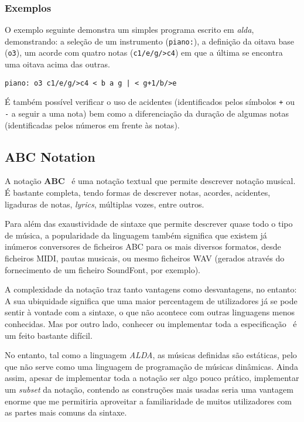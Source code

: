 \subsubsection{Exemplos}
O exemplo seguinte demonstra um simples programa escrito em \textit{alda}, demonstrando: a seleção de um instrumento (\texttt{piano:}), a definição da oitava base (\texttt{o3}), um acorde com quatro notas (\texttt{c1/e/g/>c4}) em que a última se encontra uma oitava acima das outras.
\begin{lstlisting}[caption={Exemplo da linguagem alda}]
piano: o3 c1/e/g/>c4 < b a g | < g+1/b/>e
\end{lstlisting}
 É também possível verificar o uso de acidentes (identificados pelos símbolos \texttt{+} ou \texttt{-} a seguir a uma nota) bem como a diferenciação da duração de algumas notas (identificadas pelos números em frente às notas).
\subsection{ABC Notation}
A notação \textbf{ABC}~\citep{AbcPlus, abc-notation} é uma notação textual que permite descrever notação musical. É bastante completa, tendo formas de descrever notas, acordes, acidentes, ligaduras de notas, \textit{lyrics}, múltiplas vozes, entre outros.

Para além das exaustividade de sintaxe que permite descrever quase todo o tipo de música, a popularidade da linguagem também significa que existem já inúmeros conversores de ficheiros ABC para os mais diversos formatos, desde ficheiros MIDI, pautas musicais, ou mesmo ficheiros WAV (gerados através do fornecimento de um ficheiro SoundFont, por exemplo).

A complexidade da notação traz tanto vantagens como desvantagens, no entanto: A sua ubiquidade significa que uma maior percentagem de utilizadores já se pode sentir à vontade com a sintaxe, o que não acontece com outras linguagens menos conhecidas. Mas por outro lado, conhecer ou implementar toda a especificação~\citep{abc-notation-standard} é um feito bastante difícil.

No entanto, tal como a linguagem \textit{ALDA}, as músicas definidas são estáticas, pelo que não serve como uma linguagem de programação de músicas dinâmicas. Ainda assim, apesar de implementar toda a notação ser algo pouco prático, implementar um \textit{subset} da notação, contendo as construções mais usadas seria uma vantagem enorme que me permitiria aproveitar a familiaridade de muitos utilizadores com as partes mais comuns da sintaxe.

